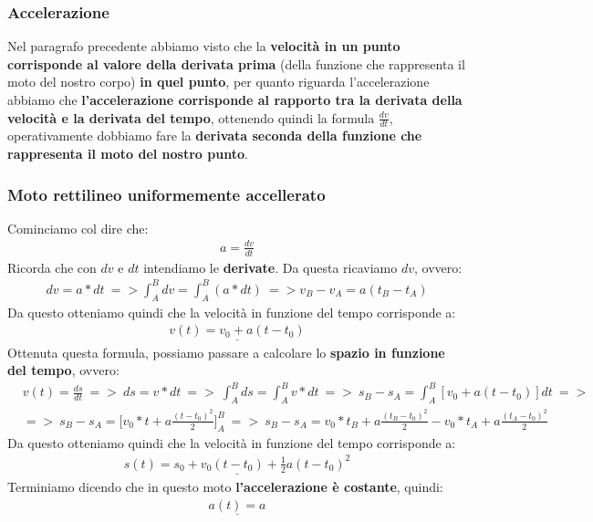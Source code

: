 		\subsubsection{Accelerazione}
			Nel paragrafo precedente abbiamo visto che la \textbf{velocità in un punto corrisponde al valore della derivata prima} (della funzione che rappresenta il moto del nostro corpo) \textbf{in quel punto}, per quanto riguarda l'accelerazione abbiamo che \textbf{l'accelerazione corrisponde al rapporto tra la derivata della velocità e la derivata del tempo}, ottenendo quindi la formula $\frac{dv}{dt}$, operativamente dobbiamo fare la \textbf{derivata seconda della funzione che rappresenta il moto del nostro punto}.

		\subsubsection{Moto rettilineo uniformemente accellerato}
			Cominciamo col dire che:
			\begin{align*}
				a=\frac{dv}{dt}
			\end{align*}
			Ricorda che con $dv$ e $dt$ intendiamo le \textbf{derivate}. Da questa ricaviamo $dv$, ovvero:
			\begin{align*}
				dv = a*dt\ => \int_A^B dv = \int_A^B (a*dt)\ => v_B-v_A = a(t_B-t_A)
			\end{align*}
			Da questo otteniamo quindi che la velocità in funzione del tempo corrisponde a:
			\begin{align*}
				\underline{v(t)=v_0+a(t-t_0)}
			\end{align*}
			Ottenuta questa formula, possiamo passare a calcolare lo \textbf{spazio in funzione del tempo}, ovvero:
			\begin{align*}
				&v(t) = \frac{ds}{dt}\ =>\ ds = v*dt\ =>\ \int_A^B ds = \int_A^B v*dt\ =>\ s_B-s_A = \int_A^B [v_0+a(t-t_0)] dt\ =>\ \\
				&=>\ s_B-s_A = \bigg[v_0*t+a\frac{(t-t_0)^2}{2}\bigg]_A^B\ =>\ s_B-s_A = v_0*t_B+a\frac{(t_B-t_0)^2}{2} - v_0*t_A+a\frac{(t_A-t_0)^2}{2}
			\end{align*}
			Da questo otteniamo quindi che la velocità in funzione del tempo corrisponde a:
			\begin{align*}
				\underline{s(t)=s_0+v_0(t-t_0)+\frac{1}{2}a(t-t_0)^2}
			\end{align*}
			Terminiamo dicendo che in questo moto \textbf{l'accelerazione è costante}, quindi:
			\begin{align*}
				\underline{a(t)= a}
			\end{align*}


